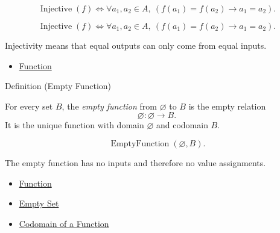 \begin{remark*}
\[
  \operatorname{Injective}(f)
  \iff
  \forall a_1,a_2\in A,\ (f(a_1)=f(a_2)\to a_1=a_2).
\]
\end{remark*}

\begin{remark*}
\[
  \operatorname{Injective}(f)
  \iff
  \forall a_1,a_2\in A,\ (f(a_1)=f(a_2)\to a_1=a_2).
\]
\end{remark*}

\begin{remark*}[Interpretation]
Injectivity means that equal outputs can only come from equal inputs.
\end{remark*}

\begin{dependencies}
\begin{itemize}
  \item \hyperref[def:function]{Function}
\end{itemize}
\end{dependencies}

\begin{definitionbox}{Definition (Empty Function)}
\begin{definition}\label{def:empty-function}
For every set $B$, the \emph{empty function} from $\varnothing$ to $B$ is the
empty relation
\[
\varnothing:\varnothing\to B.
\]
It is the unique function with domain $\varnothing$ and codomain $B$.
\end{definition}
\end{definitionbox}

\begin{remark*}
\[
  \operatorname{EmptyFunction}(\varnothing,B).
\]
\end{remark*}

\begin{remark*}[Interpretation]
The empty function has no inputs and therefore no value assignments.
\end{remark*}

\begin{dependencies}
\begin{itemize}
  \item \hyperref[def:function]{Function}
  \item \hyperref[def:empty-set]{Empty Set}
  \item \hyperref[def:codomain]{Codomain of a Function}
\end{itemize}
\end{dependencies}

